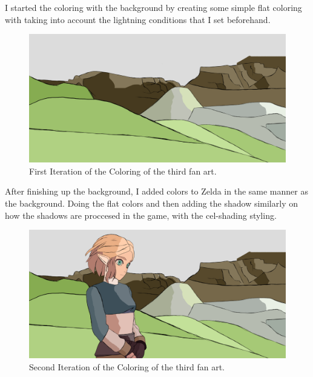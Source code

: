 \documentclass{cup-pan}
\begin{document}
        I started the coloring with the background by creating some simple flat coloring with taking into account the lightning conditions that I set beforehand. 
        \begin{figure}[H]
            \includegraphics[width=\textwidth]{Fanart3/3_Color/I_Color.png}
            \caption{First Iteration of the Coloring of the third fan art.}
        \end{figure}

        After finishing up the background, I added colors to Zelda in the same manner as the background. Doing the flat colors and then adding the shadow similarly on how the shadows are proccesed in the game, with the cel-shading styling. 
        \begin{figure}[H]
            \includegraphics[width=\textwidth]{Fanart3/3_Color/II_Color.png}
            \caption{Second Iteration of the Coloring of the third fan art.}
        \end{figure}
\end{document}
